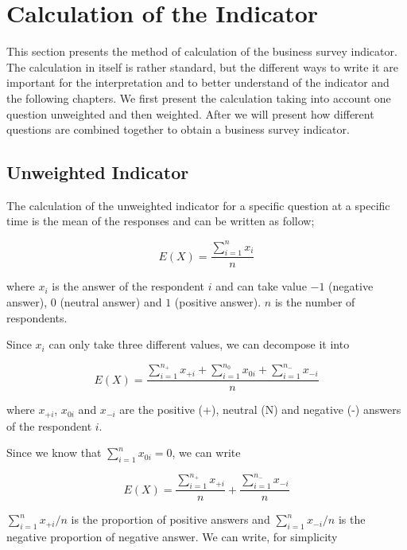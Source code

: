\documentclass[12pt,a4paper,oneside]{book}
\begin{document}
\section{Calculation of the Indicator}

This section presents the method of calculation of the business survey indicator.
The calculation in itself is rather standard, but the different ways to write it are important for the interpretation and to better understand of the indicator and the following chapters.
We first present the calculation taking into account one question unweighted and then weighted. 
After we will present how different questions are combined together to obtain a business survey indicator.


\subsection{Unweighted Indicator}

The calculation of the unweighted indicator for a specific question at a specific time is the mean of the responses and can be written as follow;

\begin{equation}
    E(X) = \frac{ \sum_{i=1}^n x_i}{n}
\end{equation} 

where 
$x_i$ is the answer of the respondent $i$ and can take value $-1$ (negative answer), $0$ (neutral answer) and $1$ (positive answer). 
$n$ is the number of respondents.

Since $x_i$ can only take three different values, we can decompose it into 

\begin{equation}
    E(X) = \frac{ \sum_{i=1}^{n_+} x_{+i} + \sum_{i=1}^{n_0} x_{0i} + \sum_{i=1}^{n_-} x_{-i}}{n}
\end{equation} 


where 
$x_{+i}$, $x_{0i}$ and $x_{-i}$ are the positive (+), neutral (N) and negative (-) answers of the respondent $i$.

Since we know that $\sum_{i=1}^n x_{0i} = 0$, we can write

\begin{equation}
    E(X) = \frac{\sum_{i=1}^{n_+} x_{+i}}{n}  + \frac{\sum_{i=1}^{n_-} x_{-i}}{n}
\end{equation} 

${\sum_{i=1}^n x_{+i}}/{n}$ is the proportion of positive answers and ${\sum_{i=1}^n x_{-i}}/{n}$ is the negative proportion of negative answer. We can write, for simplicity
\end{document}
